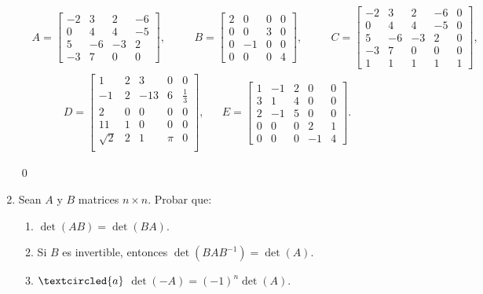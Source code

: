 \begin{enumerate}[topsep=6pt,itemsep=.4cm]
    \begin{align*}
    &A=
    \begin{bmatrix}
    -2&3&2&-6\\ 0&4&4&-5\\ 5&-6&-3&2\\ -3&7&0&0 \end{bmatrix},\quad
    &&B=\begin{bmatrix} 2&0&0&0\\ 0&0&3&0\\ 0&-1&0&0\\ 0&0&0&4\end{bmatrix},\quad
    &&
    C=\begin{bmatrix}
      -2&3&2&-6&0\\
    0&4&4&-5&0\\
    5&-6&-3&2&0\\
    -3&7&0&0&0\\
    1&1&1&1&1
      \end{bmatrix},
    \end{align*}
    \begin{align*}
    D=\begin{bmatrix}
    1&2&3&0&0\\
    -1&2&-13&6&\frac{1}{3}\\
    2&0&0&0&0\\
    11&1&0&0&0\\
    \sqrt{2}&2&1&\pi&0\\
    \end{bmatrix},&&
    E=\begin{bmatrix}
    1&-1&2&0&0\\ 3&1&4&0&0\\ 2&-1&5&0&0 \\0&0&0&2&1\\ 0&0&0&-1&4
    \end{bmatrix}.
    \end{align*}
    \rta

    \qed
    
    \item Sean $A$ y  $B$ matrices $n \times n$. Probar que:
    \begin{enumerate}
        \item $\det(AB) = \det (BA)$.
        \item Si $B$ es invertible, entonces $\det(B A B^{-1}) = \det (A)$.
        \item\label{-A} $\textcircled{a}$ $\det(-A) = (-1)^n\det (A)$.
    \end{enumerate}
    \rta


\end{enumerate}
